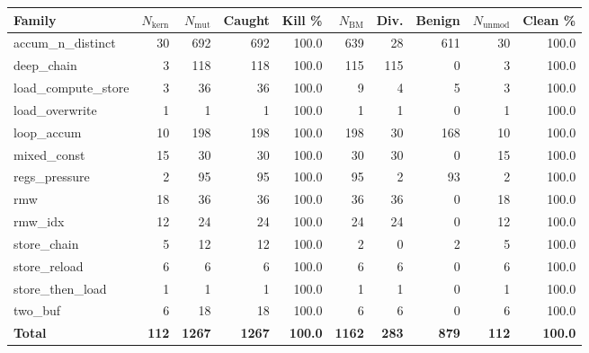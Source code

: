 \begin{tabular}{lrrrrrrrrr}
\toprule
Family & $N_{\text{kern}}$ & $N_{\text{mut}}$ & Caught & Kill \% & $N_{\text{BM}}$ & Div. & Benign & $N_{\text{unmod}}$ & Clean \% \\
\midrule
accum\_n\_distinct & 30 & 692 & 692 & 100.0 & 639 & 28 & 611 & 30 & 100.0 \\
deep\_chain & 3 & 118 & 118 & 100.0 & 115 & 115 & 0 & 3 & 100.0 \\
load\_compute\_store & 3 & 36 & 36 & 100.0 & 9 & 4 & 5 & 3 & 100.0 \\
load\_overwrite & 1 & 1 & 1 & 100.0 & 1 & 1 & 0 & 1 & 100.0 \\
loop\_accum & 10 & 198 & 198 & 100.0 & 198 & 30 & 168 & 10 & 100.0 \\
mixed\_const & 15 & 30 & 30 & 100.0 & 30 & 30 & 0 & 15 & 100.0 \\
regs\_pressure & 2 & 95 & 95 & 100.0 & 95 & 2 & 93 & 2 & 100.0 \\
rmw & 18 & 36 & 36 & 100.0 & 36 & 36 & 0 & 18 & 100.0 \\
rmw\_idx & 12 & 24 & 24 & 100.0 & 24 & 24 & 0 & 12 & 100.0 \\
store\_chain & 5 & 12 & 12 & 100.0 & 2 & 0 & 2 & 5 & 100.0 \\
store\_reload & 6 & 6 & 6 & 100.0 & 6 & 6 & 0 & 6 & 100.0 \\
store\_then\_load & 1 & 1 & 1 & 100.0 & 1 & 1 & 0 & 1 & 100.0 \\
two\_buf & 6 & 18 & 18 & 100.0 & 6 & 6 & 0 & 6 & 100.0 \\
\midrule
\textbf{Total} & \textbf{112} & \textbf{1267} & \textbf{1267} & \textbf{100.0} & \textbf{1162} & \textbf{283} & \textbf{879} & \textbf{112} & \textbf{100.0} \\
\bottomrule
\end{tabular}
